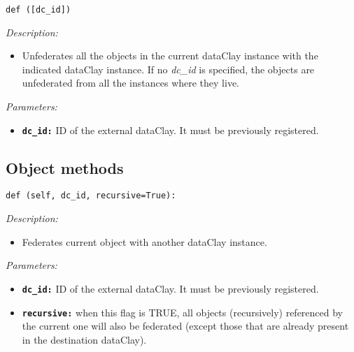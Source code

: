 \begin{dBox}

\texttt{def ([dc\_id])}
\LINE

{\it Description:}

\begin{itemize}
  \item Unfederates all the objects in the current dataClay instance with the indicated dataClay instance. If no \textit{dc\_id} is specified, the objects are unfederated from all the instances where they live.
\end{itemize}

{\it Parameters:}

\begin{itemize}
  \item \texttt{\bfseries dc\_id:} ID of the external dataClay. It must be previously registered.
\end{itemize}

\end{dBox}

\subsection{Object methods}
\label{sec:PythonFederationObject}

\begin{dBox}
\texttt{def (self, dc\_id, recursive=True):}
\LINE

{\it Description:}

\begin{itemize}
  \item Federates current object with another dataClay instance. 
\end{itemize}

{\it Parameters:}

\begin{itemize}
  \item \texttt{\bfseries dc\_id:} ID of the external dataClay. It must be previously registered.
  \item \texttt{\bfseries recursive:} when this flag is TRUE, all objects (recursively) referenced by the current one will also be federated (except those that are already present in the destination dataClay). 
\end{itemize}

\end{dBox}


